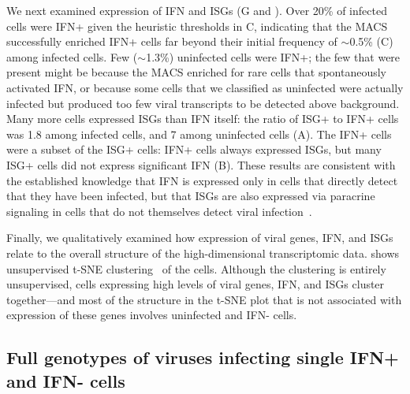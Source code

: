 \documentclass[9pt,lineno]{elife}
\begin{document}
We next examined expression of IFN and ISGs (G and ).
Over 20\% of  infected cells were IFN+ given the heuristic thresholds in C, indicating that the MACS successfully enriched IFN+ cells far beyond their initial frequency of $\sim$0.5\% (C) among infected cells.
Few ($\sim$1.3\%) uninfected cells were IFN+; the few that were present might be because the MACS enriched for rare cells that spontaneously activated IFN, or because some cells that we classified as uninfected were actually infected but produced too few viral transcripts to be detected above background.
Many more cells expressed ISGs than IFN itself: the ratio of ISG+ to IFN+ cells was 1.8 among infected cells, and 7 among uninfected cells (A).
The IFN+ cells were a subset of the ISG+ cells: IFN+ cells always expressed ISGs, but many ISG+ cells did not express significant IFN (B).
These results are consistent with the established knowledge that IFN is expressed only in cells that directly detect that they have been infected, but that ISGs are also expressed via paracrine signaling in cells that do not themselves detect viral infection~\citep{stetson2006type,honda2006type}.

Finally, we qualitatively examined how expression of viral genes, IFN, and ISGs relate to the overall structure of the high-dimensional transcriptomic data.
 shows unsupervised t-SNE clustering~\citep{maaten2008visualizing} of the cells.
Although the clustering is entirely unsupervised, cells expressing high levels of viral genes, IFN, and ISGs cluster together---and most of the structure in the t-SNE plot that is not associated with expression of these genes involves uninfected and IFN- cells.

\subsection{Full genotypes of viruses infecting single IFN+ and IFN- cells}
\end{document}
